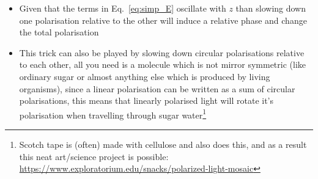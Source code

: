 \documentclass[english]{article}
\newcommand{\average}[1]{\langle #1 \rangle}
\begin{document}
\begin{itemize}
\begin{itemize}
\item The phase in $|A_s|\exp(i \phi_s)=|\average{\hat{a}_s}|\exp(i \phi_s)=\average{\hat{a}_s}$ will lead to an electric field of $\sin(k z-\omega t+\phi_s)$ in each polarisation: $\vec{E}=2\vec{e}_0|A_0|\sin(k z-\omega t+\phi_0)+2\vec{e}_1|A_1|\sin(k z-\omega t+\phi_1)$
\item If $\phi_0=\phi_1$ than both will be in phase and the direction won't change, but if $|A_0|=|A_1|$ and $\phi_0=\phi_1+(2n+1) \pi$, than they will be out of phase (and able to completely cancel) and the polarisation will rotate in time
\end{itemize}
\item Given that the terms in Eq.~\ref{eq:simp_E} oscillate with $z$ than slowing down one polarisation relative to the other will induce a relative phase and change the total polarisation 
\item This trick can also be played by slowing down circular polarisations relative to each other, all you need is a molecule which is not mirror symmetric (like ordinary sugar or almost anything else which is produced by living organisms), since a linear polarisation can be written as a sum of circular polarisations, this means that linearly polarised light will rotate it's polarisation when travelling through sugar water\footnote{Scotch tape is (often) made with cellulose and also does this, and as a result this neat art/science project is possible: \href{https://www.exploratorium.edu/snacks/polarized-light-mosaic}{https://www.exploratorium.edu/snacks/polarized-light-mosaic}}
\end{itemize}
\end{document}
